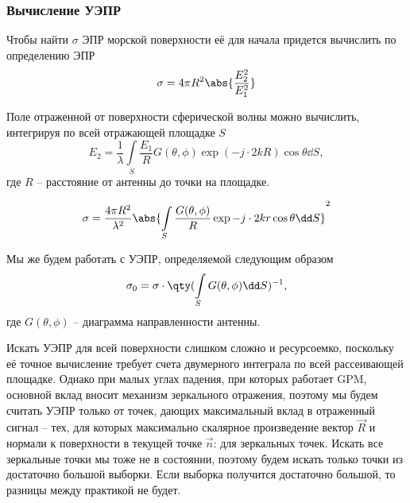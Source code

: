\subsubsection*{Вычисление УЭПР}%

Чтобы найти $\sigma$ ЭПР морской поверхности её для начала придется вычислить по
определению ЭПР 
\begin{equation}
    \sigma = 4 \pi R^2 \abs{\frac{E_2^2}{E_1^2}}
\end{equation}

Поле отраженной от поверхности сферической волны можно вычислить,
интегрируя по всей отражающей площадке $S$
\begin{equation}
    E_2 = \frac{1}{\lambda} \int\limits_{S} \frac{E_1}{R} G(\theta, \phi) \exp(-j \cdot 2 k R)
    \cos \theta \dd S,
\end{equation}
где $R$ -- расстояние от антенны до точки на площадке. 


\begin{equation}
    \label{eq:sigma}
    \sigma = \frac{4 \pi R^2}{\lambda^2} \abs{\int\limits_{S}^{} \frac{G(\theta,
            \phi)}{R} \exp{-j \cdot 2 k
    r } \cos \theta \dd S}^2
\end{equation}

Мы же будем работать с УЭПР, определяемой следующим образом
\begin{equation}
    \label{eq:crosssec}
    \sigma_0 =   \sigma \cdot \qty(\int\limits_S G(\theta, \phi) \dd S)^{-1},
\end{equation}
где $G(\theta, \phi)$ -- диаграмма направленности антенны.

Искать УЭПР для всей поверхности слишком сложно и ресурсоемко, поскольку
её точное вычисление требует счета двумерного интеграла по всей
рассеивающей площадке. Однако при малых углах падения, при которых
работает GPM, основной вклад вносит механизм зеркального отражения, поэтому мы
будем считать УЭПР только от точек, дающих максимальный вклад в отраженный
сигнал -- тех, для которых максимально скалярное произведение вектор $\vec R$ и
нормали к поверхности в текущей точке  $\vec n$: для зеркальных точек. Искать
все зеркальные точки мы тоже не в состоянии, поэтому будем искать только точки
из достаточно большой выборки. Если выборка получится достаточно большой, то
разницы между практикой не будет. 

